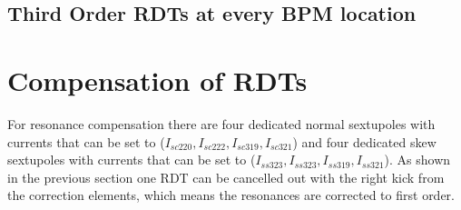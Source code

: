 
\subsection{Third Order RDTs at every BPM location}

\section{Compensation of RDTs}

For resonance compensation there are four dedicated normal sextupoles with currents that can be set to ($I_{sc220},I_{sc222},I_{sc319},I_{sc321}$) and four dedicated skew sextupoles with currents that can be set to ($I_{ss323},I_{ss323},I_{ss319},I_{ss321}$). As shown in the previous section one RDT can be cancelled out with the right kick from the correction elements, which means the resonances are corrected to first order. 

